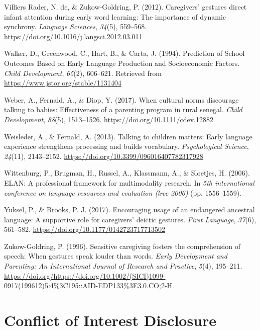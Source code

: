 \documentclass[
  english,
  man,floatsintext]{apa6}
\begin{document}
\leavevmode\hypertarget{ref-de_villiers_rader_caregivers_2012}{}%
Villiers Rader, N. de, \& Zukow-Goldring, P. (2012). Caregivers' gestures direct infant attention during early word learning: The importance of dynamic synchrony. \emph{Language Sciences}, \emph{34}(5), 559--568. \url{https://doi.org/10.1016/j.langsci.2012.03.011}

\leavevmode\hypertarget{ref-walker_prediction_1994}{}%
Walker, D., Greenwood, C., Hart, B., \& Carta, J. (1994). Prediction of School Outcomes Based on Early Language Production and Socioeconomic Factors. \emph{Child Development}, \emph{65}(2), 606--621. Retrieved from \url{https://www.jstor.org/stable/1131404}

\leavevmode\hypertarget{ref-weber_when_2017}{}%
Weber, A., Fernald, A., \& Diop, Y. (2017). When cultural norms discourage talking to babies: Effectiveness of a parenting program in rural senegal. \emph{Child Development}, \emph{88}(5), 1513--1526. \url{https://doi.org/10.1111/cdev.12882}

\leavevmode\hypertarget{ref-weisleder_talking_2013}{}%
Weisleder, A., \& Fernald, A. (2013). Talking to children matters: Early language experience strengthens processing and builds vocabulary. \emph{Psychological Science}, \emph{24}(11), 2143--2152. \url{https://doi.org/10.3399/096016407782317928}

\leavevmode\hypertarget{ref-wittenburg2006elan}{}%
Wittenburg, P., Brugman, H., Russel, A., Klassmann, A., \& Sloetjes, H. (2006). ELAN: A professional framework for multimodality research. In \emph{5th international conference on language resources and evaluation (lrec 2006)} (pp. 1556--1559).

\leavevmode\hypertarget{ref-yuksel_encouraging_2017}{}%
Yuksel, P., \& Brooks, P. J. (2017). Encouraging usage of an endangered ancestral language: A supportive role for caregivers' deictic gestures. \emph{First Language}, \emph{37}(6), 561--582. \url{https://doi.org/10.1177/0142723717713502}

\leavevmode\hypertarget{ref-zukow-goldring_sensitive_1996}{}%
Zukow-Goldring, P. (1996). Sensitive caregiving fosters the comprehension of speech: When gestures speak louder than words. \emph{Early Development and Parenting: An International Journal of Research and Practice}, \emph{5}(4), 195--211. \url{https://doi.org/https://doi.org/10.1002/(SICI)1099-0917(199612)5:4\%3C195::AID-EDP133\%3E3.0.CO;2-H}

\hypertarget{conflict-of-interest-disclosure}{%
\section{Conflict of Interest Disclosure}\label{conflict-of-interest-disclosure}}
\end{document}

